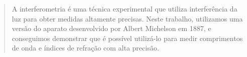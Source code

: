 \begin{abstract}  

A interferometria é uma técnica experimental que utiliza interferência da luz para obter medidas altamente precisas. 
Neste trabalho, utilizamos uma versão do aparato desenvolvido por Albert Michelson em 1887, e conseguimos demonstrar que é possível utilizá-lo para medir comprimentos de onda e índices de refração com alta precisão.  

\end{abstract}

